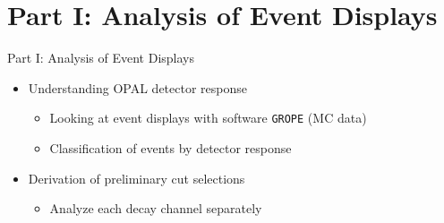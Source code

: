 \documentclass[11pt,xcolor=dvipsnames,professionalfonts]{beamer}
\begin{document}
\section{Part I: Analysis of Event Displays}
\begin{frame}{Part I: Analysis of Event Displays}
	\begin{itemize}
		\setlength\itemsep{2.em}
		\item Understanding OPAL detector response
		\begin{itemize}
			\setlength\itemsep{0.5em}
			\item Looking at event displays with software \texttt{GROPE} (MC data)
			\item Classification of events by detector response
		\end{itemize}
		
		\item Derivation of preliminary cut selections
		\begin{itemize}
			\setlength\itemsep{0.5em}
			\item Analyze each decay channel separately
		\end{itemize}
	\end{itemize}
\end{frame}
\end{document}
